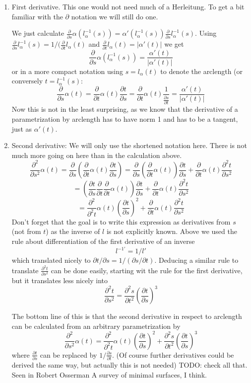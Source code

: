 \begin{enumerate}
\item First derivative. This one would not need much of a Herleitung. To get a bit familiar with the $\partial$ notation we will still do one.

We just calculate $\frac{\partial}{\partial s} \alpha(l_\alpha^{-1}(s)) = \alpha'(l_\alpha^{-1}(s)) \frac{\partial}{\partial s} l_\alpha^{-1}(s)$. Using $\frac{\partial}{\partial s} l_\alpha^{-1}(s) = 1/(\frac{\partial}{\partial t} l_\alpha(t)$ and $\frac{\partial}{\partial t} l_\alpha(t) = |\alpha'(t)|$ we get
\[\frac{\partial}{\partial s} \alpha(l_\alpha^{-1}(s)) = \frac{\alpha'(t)}{|\alpha'(t)|}
\] 
or in a more compact notation using $ s = l_\alpha(t)$ to denote the arclength (or conversely $t = l_\alpha^{-1}(s)$:
\[
\frac{\partial}{\partial s} \alpha(t) = \frac{\partial}{\partial t} \alpha(t) \frac{\partial t}{\partial s} = \frac{\partial}{\partial t} \alpha(t) \frac{1}{\frac{\partial s}{\partial t}} = \frac{\alpha'(t)}{|\alpha'(t)|}
\]
Now this is not in the least surprising, as we know that the derivative of a parametrization by arclength has to have norm 1 and has to be a tangent, just as $\alpha'(t)$.
\item Second derivative: We will only use the shortened notation here. There is not much more going on here than in the calculation above.
\[
\frac{\partial^2}{\partial s^2} \alpha(t) = \frac{\partial}{\partial s}(\frac{\partial}{\partial t} \alpha(t) \frac{\partial t}{\partial s}) = \frac{\partial}{\partial s}(\frac{\partial}{\partial t} \alpha(t))\frac{\partial t}{\partial s} + \frac{\partial}{\partial t} \alpha(t) \frac{\partial^2 t}{\partial s^2}
\]
\[= ( \frac{\partial t}{\partial s} \frac{\partial}{\partial t} \frac{\partial}{\partial t} \alpha(t))\frac{\partial t}{\partial s} + \frac{\partial}{\partial t} \alpha(t) \frac{\partial^2 t}{\partial s^2}\] 
\[= \frac{\partial^2}{\partial^2 t} \alpha(t)(\frac{\partial t}{\partial s})^2 + \frac{\partial}{\partial t} \alpha(t) \frac{\partial^2 t}{\partial s^2}\] 
Don't forget that the goal is to write this expression as derivatives from $s$ (not from $t$) as the inverse of $l$ is not explicitly known. Above we used the rule about differentiation of the first derivative of an inverse \[l^{-1\prime} = 1/l'\] which translated nicely to $\partial t/\partial s = 1/(\partial s/\partial t)$. Deducing a similar rule to translate $\frac{\partial^2 t}{\partial s^2}$ can be done easily, starting wit the rule for the first derivative, but it translates less nicely into
\[\frac{\partial^2 t}{\partial s^2} = \frac{\partial^2 s}{\partial t^2}(\frac{\partial t}{\partial s})^3\]

The bottom line of this is that the second derivative in respect to arclength can be calculated from an arbitrary parametrization by
\[
\frac{\partial^2}{\partial s^2} \alpha(t) = \frac{\partial^2}{\partial^2 t} \alpha(t)(\frac{\partial t}{\partial s})^2 + \frac{\partial^2 s}{\partial t^2}(\frac{\partial t}{\partial s})^3
\]
where $\frac{\partial t}{\partial s}$ can be replaced by $1/\frac{\partial s}{\partial t}$.
(Of course further derivatives could be derived the same way, but actually this is not needed)
TODO: check all that. Seen in Robert Osserman A survey of minimal surfaces, I think.
\end{enumerate}